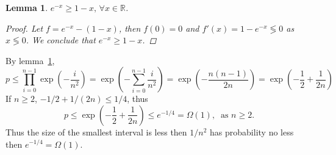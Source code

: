\documentclass[12pt, a4paper]{article}
\newtheorem{lemma}{Lemma}
\begin{document}
\begin{lemma} \label{lemma:1-x-less-then-exp--x}
  $e^{-x} \geq 1 - x,\, \forall x \in \mathbb{R}$.

  \begin{proof}
    Let $f = e^{-x} - (1-x)$, then $f(0) = 0$ and $f'(x) = 1 - e^{-x} \lessgtr 0$ as $x \lessgtr 0$.
    We conclude that $e^{-x} \geq 1 - x$.
  \end{proof}
\end{lemma}

By lemma~\ref{lemma:1-x-less-then-exp--x},
\[ p \leq \prod_{i = 0}^{n-1} \exp\left(- \frac{i}{n^2} \right)
= \exp\left( -\sum_{i = 0}^{n-1} \frac{i}{n^2} \right) = \exp\left( - \frac{n  (n-1)}{2n} \right)
= \exp\left( - \frac{1}{2} + \frac{1}{2n} \right) \]
If $n \geq 2$, $-1/2 + 1/(2n) \leq 1/4$, thus
\[ p \leq \exp\left( - \frac{1}{2} + \frac{1}{2n} \right) \leq e^{-1/4} = \Omega(1), \ \text{ as } n \geq 2.\]
Thus the size of the smallest interval is less then $1/n^2$ has probability no less then $e^{-1/4} = \Omega(1)$.
\end{document}
